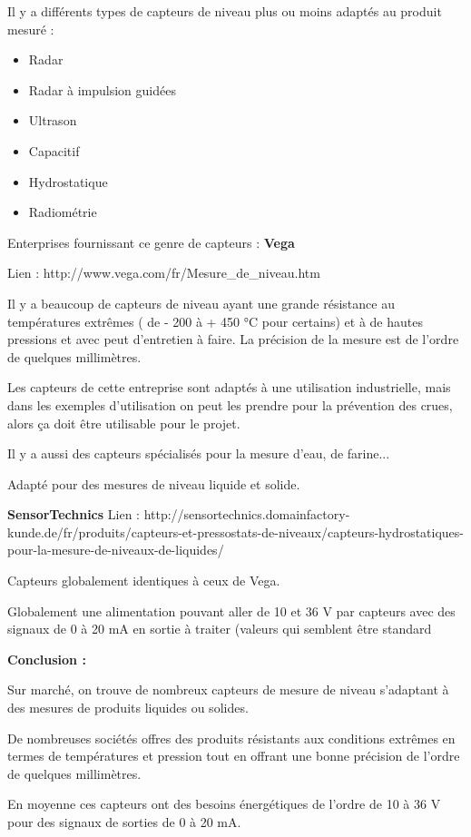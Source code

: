 \documentclass{article}
\begin{document}
Il y a différents types de capteurs de niveau plus ou moins adaptés au
produit mesuré :

\begin{itemize}
\item Radar
\item Radar à impulsion guidées
\item Ultrason
\item Capacitif
\item Hydrostatique
\item Radiométrie
\end{itemize}

Enterprises fournissant ce genre de capteurs :
\textbf{Vega}

Lien :
http://www.vega.com/fr/Mesure\_de\_niveau.htm

Il y a beaucoup de capteurs de niveau ayant une grande résistance au
températures extrêmes ( de - 200 à + 450 °C pour certains) et à de
hautes pressions et avec peut d'entretien à faire. La
précision de la mesure est de l’ordre de quelques millimètres.

Les capteurs de cette entreprise sont adaptés à une utilisation
industrielle, mais dans les exemples d’utilisation on peut les prendre
pour la prévention des crues, alors ça doit être utilisable pour le
projet.

Il y a aussi des capteurs spécialisés pour la mesure d’eau, de farine...

Adapté pour des mesures de niveau liquide et solide.

\textbf{SensorTechnics}
Lien : 
http://sensortechnics.domainfactory-kunde.de/fr/produits/capteurs-et-pressostats-de-niveaux/capteurs-hydrostatiques-pour-la-mesure-de-niveaux-de-liquides/

Capteurs globalement identiques à ceux de Vega.

Globalement une alimentation pouvant aller de 10 et 36 V par capteurs
avec des signaux de 0 à 20 mA en sortie à traiter (valeurs qui semblent
être standard

\textbf{Conclusion :}

Sur marché, on trouve de nombreux capteurs de mesure de niveau
s’adaptant à des mesures de produits liquides ou solides.

De nombreuses sociétés offres des produits résistants aux conditions
extrêmes en termes de températures et pression tout en offrant une
bonne précision de l’ordre de quelques millimètres.

En moyenne ces capteurs ont des besoins énergétiques de l’ordre de 10 à
36 V pour des signaux de sorties de 0 à 20 mA.
\end{document}
